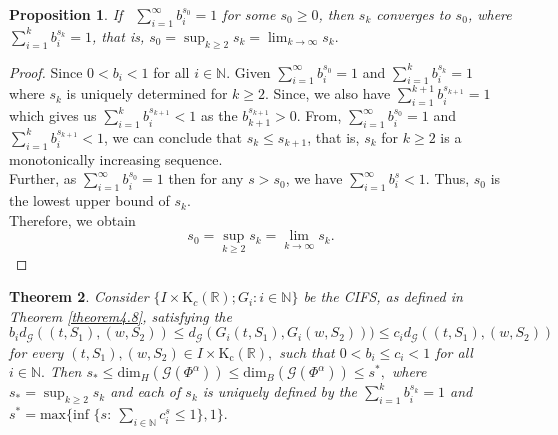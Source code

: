\documentclass[12pt,oneside,reqno]{amsart}
\newtheorem{theorem}{Theorem}[section]
\newtheorem{proposition}[theorem]{Proposition}
\theoremstyle{definition}
\theoremstyle{remark}
\begin{document}
   \begin{proposition}\label{prop6}
    If~ $ \sum_{i=1}^{\infty}b_i^{s_0} =1$ for some $s_0 \ge 0$, then $s_k$ converges to $s_0$, where $\sum_{i=1}^{k}b_i^{s_k} =1$, that is, $s_0= \sup_{k\geq 2}s_k =\lim_{k \to \infty} s_k.$
\end{proposition}
\begin{proof}
    Since $ 0<b_i<1$ for all $i\in \mathbb{N}$. Given $\sum_{i=1}^{\infty}b_i^{s_0} =1$ and $\sum_{i=1}^{k}b_i^{s_k} =1$ where $s_k$ is uniquely determined for $k\geq 2$. Since, we also have $\sum_{i=1}^{k+1}b_i^{s_{k+1}} =1$ which gives us $\sum_{i=1}^{k}b_i^{s_{k+1}} <1$ as the $b_{k+1}^{s_{k+1}}>0$.
    From,  $\sum_{i=1}^{\infty}b_i^{s_0} =1$ and $\sum_{i=1}^{k}b_i^{s_{k+1}} <1$, we can conclude that $s_k\leq s_{k+1}$, that is, $s_k$ for $k\geq 2$ is a monotonically increasing sequence. \\ Further, as $\sum_{i=1}^{\infty}b_i^{s_0} =1$ then for any $s > s_0$, we have $\sum_{i=1}^{\infty}b_i^{s}<1$. Thus, $s_0$ is the lowest upper bound of $s_k$.\\ Therefore, we obtain \[ s_0= \sup_{k\geq 2}s_k =\lim_{k \to \infty} s_k. \]
\end{proof}
\begin{theorem}
 Consider $ \{I\times \mathrm{K}_c(\mathbb{R});G_i:i\in \mathbb{N}\}$ be the CIFS, as defined in Theorem \ref{theorem4.8}, satisfying the 
 \[b_id_\mathcal{G}((t,S_1),(w,S_2))\leq d_\mathcal{G}(G_i(t,S_1),G_i(w,S_2)))\le  c_id_\mathcal{G}((t,S_1),(w,S_2))\] for every $(t,S_1),(w,S_2)\in I \times \mathrm{K_c(\mathbb{R})},$ such that $0<b_i\le c_i < 1$ for all $i \in \mathbb{N}.$ Then $s_*\le \text{dim}_H(\mathcal{G}(\Phi^\alpha))\le\text{dim}_B(\mathcal{G}(\Phi^\alpha))\le s^*,$ where $s_*=\sup_{k\geq 2}s_k$ and each of $s_k$ is uniquely defined by the $\sum_{i=1}^{k}b_i^{s_k} =1$ and $s^*=\text{max}\bigg\{ \text{inf } \big\{s: ~ \sum_{i\in \mathbb{N}}c_{i}^s \le 1 \big\},1\bigg\}.$
\end{theorem}
\end{document}
